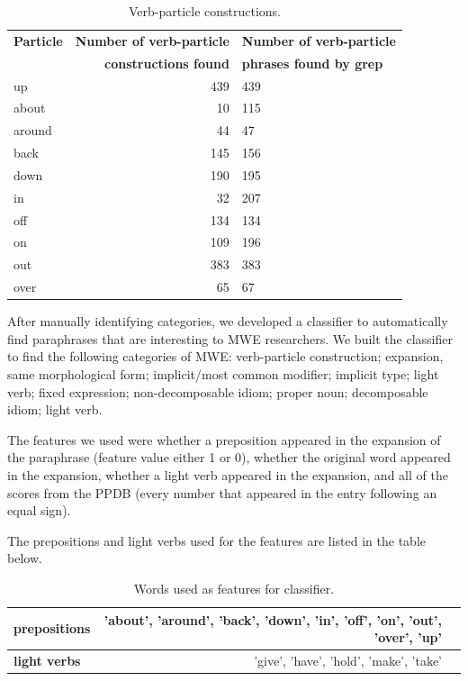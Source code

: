\documentclass[11pt]{article}
\begin{document}
\begin{table}[h]
\begin{center}
\begin{tabular}{|l|r|l|}
\hline \bf Particle & \bf Number of verb-particle  & \bf Number of verb-particle\\ 
 & \bf constructions found & \bf  phrases found by grep \\ \hline
up & 439 & 439 \\
about & 10 & 115 \\
around & 44 & 47 \\
back & 145 & 156 \\
down & 190 & 195 \\
in & 32 & 207 \\
off & 134 & 134 \\
on & 109 & 196 \\
out & 383 & 383 \\
over & 65 & 67 \\
\hline
\end{tabular}
\end{center}
\caption{\label{font-table} Verb-particle constructions. }
\end{table}

After manually identifying categories, we developed a classifier to automatically find paraphrases that are interesting to MWE researchers. We built the classifier to find the following categories of MWE: verb-particle construction; expansion, same morphological form; implicit/most common modifier; implicit type; light verb; fixed expression; non-decomposable idiom; proper noun; decomposable idiom; light verb. 

The features we used were whether a preposition appeared in the expansion of the paraphrase (feature value either 1 or 0), whether the original word appeared in the expansion, whether a light verb appeared in the expansion, and all of the scores from the PPDB (every number that appeared in the entry following an equal sign).

The prepositions and light verbs used for the features are listed in the table below.

\begin{table}[h]
\begin{center}
\begin{tabular}{|l|rl|}
\hline \bf prepositions &  'about', 'around', 'back', 'down', 'in', 'off', 'on', 'out', 'over', 'up'  &\\ \hline
\bf light verbs &  'give', 'have', 'hold', 'make', 'take' &\\
\hline
\end{tabular}
\end{center}
\caption{\label{font-table} Words used as features for classifier. }
\end{table}
\end{document}
